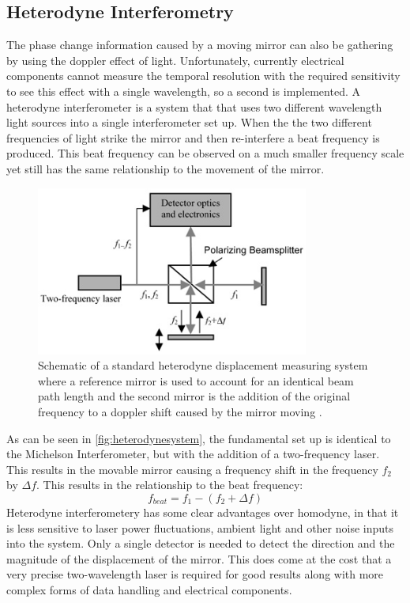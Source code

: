 \documentclass[12pt,a4paper,oneside]{report}
\begin{document}
	\subsection{Heterodyne Interferometry}
The phase change information caused by a moving mirror can also be gathering by using the doppler effect of light. Unfortunately, currently electrical components cannot measure the temporal resolution with the required sensitivity to see this effect with a single wavelength, so a second is implemented. A heterodyne interferometer is a system that that uses two different wavelength light sources into a single interferometer set up. When the the two different frequencies of light strike the mirror and then re-interfere a beat frequency is produced. This beat frequency can be observed on a much smaller frequency scale yet still has the same relationship to the movement of the mirror.

\begin{figure}[H]
\includegraphics[width=0.8\textwidth, center,angle=0]{Images/heterodyne_system.jpg}
\caption{Schematic of a standard heterodyne displacement measuring system where a reference mirror is used to account for an identical beam path length and the second mirror is the addition of the original frequency to a doppler shift caused by the mirror moving \cite{HeterodyneInterferometer}.}
\label{fig:heterodynesystem}
\end{figure}

As can be seen in \autoref{fig:heterodynesystem}, the fundamental set up is identical to the Michelson Interferometer, but with the addition of a two-frequency laser. This results in the movable mirror causing a frequency shift in the frequency $f_{2}$ by $\Delta f$. This results in the relationship to the beat frequency:
\begin{equation}
f_{beat} = f_{1} - (f_{2} + \Delta f)
	\label{eq:dopplershift}
\end{equation}
Heterodyne interferometery has some clear advantages over homodyne, in that it is less sensitive to laser power fluctuations, ambient light and other noise inputs into the system. Only a single detector is needed to detect the direction and the magnitude of the displacement of the mirror. This does come at the cost that a very precise two-wavelength laser is required for good results along with more complex forms of data handling and electrical components.
\end{document}
